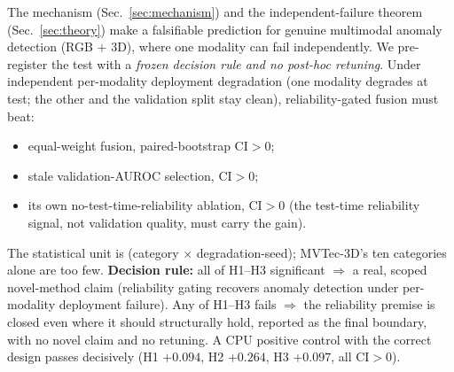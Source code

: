\documentclass[11pt,titlepage]{article}
\begin{document}
The mechanism (Sec.~\ref{sec:mechanism}) and the independent-failure theorem
(Sec.~\ref{sec:theory}) make a falsifiable prediction for genuine multimodal anomaly
detection (RGB $+$ 3D), where one modality can fail independently. We pre-register the
test with a \emph{frozen decision rule and no post-hoc retuning}. Under independent
per-modality deployment degradation (one modality degrades at test; the other and the
validation split stay clean), reliability-gated fusion must beat:
\begin{itemize}
\item[\textbf{H1}] equal-weight fusion, paired-bootstrap CI$>0$;
\item[\textbf{H2}] stale validation-AUROC selection, CI$>0$;
\item[\textbf{H3}] its own no-test-time-reliability ablation, CI$>0$ (the test-time
reliability signal, not validation quality, must carry the gain).
\end{itemize}
The statistical unit is (category $\times$ degradation-seed); MVTec-3D's ten categories
alone are too few. \textbf{Decision rule:} all of H1--H3 significant $\Rightarrow$ a real,
scoped novel-method claim (reliability gating recovers anomaly detection under
per-modality deployment failure). Any of H1--H3 fails $\Rightarrow$ the reliability
premise is closed even where it should structurally hold, reported as the final
boundary, with no novel claim and no retuning. A CPU positive control with the correct
design passes decisively (H1 $+0.094$, H2 $+0.264$, H3 $+0.097$, all CI$>0$).
\end{document}
